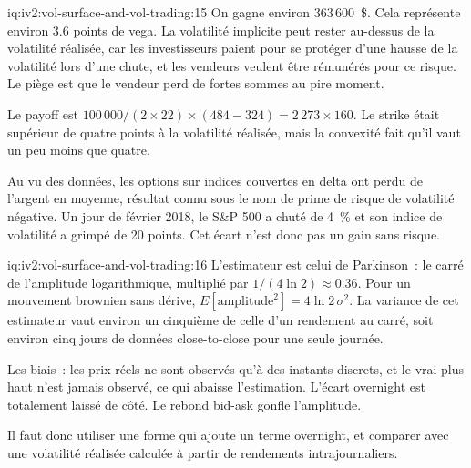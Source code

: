 \begin{solution}{iq:iv2:vol-surface-and-vol-trading:15}
On gagne environ 363\,600~\$. Cela représente environ 3.6 points de vega. La volatilité implicite peut rester au-dessus de la volatilité réalisée, car les investisseurs paient pour se protéger d'une hausse de la volatilité lors d'une chute, et les vendeurs veulent être rémunérés pour ce risque. Le piège est que le vendeur perd de fortes sommes au pire moment.

Le payoff est $100\,000/(2 \times 22) \times (484 - 324) = 2\,273 \times 160$. Le strike était supérieur de quatre points à la volatilité réalisée, mais la convexité fait qu'il vaut un peu moins que quatre.

Au vu des données, les options sur indices couvertes en delta ont perdu de l'argent en moyenne, résultat connu sous le nom de prime de risque de volatilité négative. Un jour de février 2018, le S\&P 500 a chuté de 4~\% et son indice de volatilité a grimpé de 20 points. Cet écart n'est donc pas un gain sans risque.

\end{solution}

\begin{solution}{iq:iv2:vol-surface-and-vol-trading:16}
L'estimateur est celui de Parkinson~: le carré de l'amplitude logarithmique, multiplié par $1/(4\ln 2) \approx 0.36$. Pour un mouvement brownien sans dérive, $E[\text{amplitude}^2] = 4\ln 2\,\sigma^2$. La variance de cet estimateur vaut environ un cinquième de celle d'un rendement au carré, soit environ cinq jours de données close-to-close pour une seule journée.

Les biais~: les prix réels ne sont observés qu'à des instants discrets, et le vrai plus haut n'est jamais observé, ce qui abaisse l'estimation. L'écart overnight est totalement laissé de côté. Le rebond bid-ask gonfle l'amplitude.

Il faut donc utiliser une forme qui ajoute un terme overnight, et comparer avec une volatilité réalisée calculée à partir de rendements intrajournaliers.

\end{solution}

